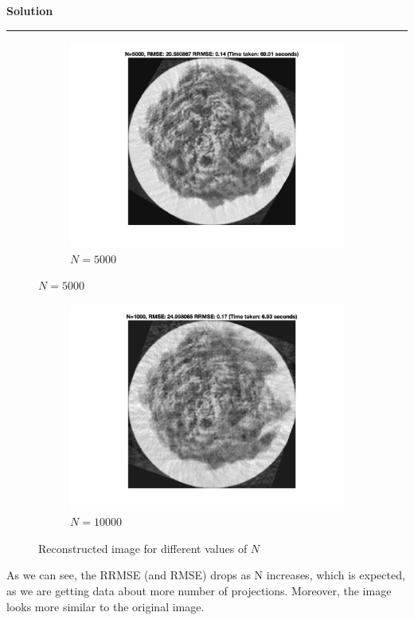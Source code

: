 \documentclass[a4paper,12pt]{article}
\newenvironment{solution}[2][]{%
    \begin{mdframed}[linecolor=blue!70!black, linewidth=2pt, roundcorner=10pt, backgroundcolor=yellow!10!white, skipabove=12pt, skipbelow=12pt]%
        \textbf{\large #2}
        \par\noindent\rule{\textwidth}{0.4pt}
}{
    \end{mdframed}
}
\begin{document}
\begin{solution}{Solution}
\begin{figure}[H]
\begin{subfigure}[t]{0.32\textwidth}
      \includegraphics[width=\textwidth]{../images/reconstructed_N5000.png}
      \caption*{$N = 5000$}
    \end{subfigure}
    \label{fig:recons2}
  \end{figure}

  \begin{figure}[H]
    \centering
    
    \begin{subfigure}[t]{0.32\textwidth}
        \centering
        \includegraphics[width=\textwidth]{../images/reconstructed_N1000.png}
        \caption*{$N = 10000$}
    \end{subfigure}
    \caption*{Reconstructed image for different values of $N$}
    \label{fig:recons3}
  \end{figure}

  As we can see, the RRMSE (and RMSE) drops as N increases, which is expected, as we are getting data about more number of projections. Moreover, the image looks more similar to the original image. 

\end{solution}
\end{document}
